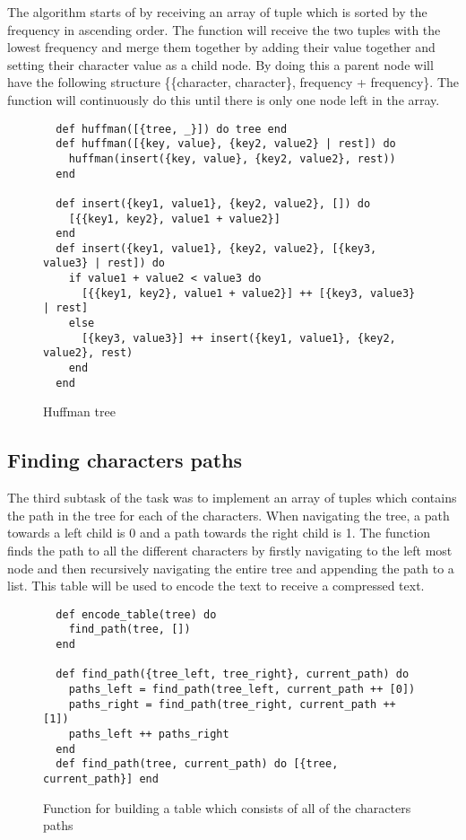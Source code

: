 \documentclass[a4paper,11pt]{article}
\begin{document}
The algorithm starts of by receiving an array of tuple which is sorted by the frequency in ascending order. The function will receive the two tuples with the lowest frequency and merge them together by adding their value together and setting their character value as a child node. By doing this a parent node will have the following structure \{\{character, character\}, frequency + frequency\}. The function will continuously do this until there is only one node left in the array.

\begin{figure}[H]
\begin{verbatim}
  def huffman([{tree, _}]) do tree end
  def huffman([{key, value}, {key2, value2} | rest]) do
    huffman(insert({key, value}, {key2, value2}, rest))
  end

  def insert({key1, value1}, {key2, value2}, []) do
    [{{key1, key2}, value1 + value2}]
  end
  def insert({key1, value1}, {key2, value2}, [{key3, value3} | rest]) do
    if value1 + value2 < value3 do
      [{{key1, key2}, value1 + value2}] ++ [{key3, value3} | rest]
    else
      [{key3, value3}] ++ insert({key1, value1}, {key2, value2}, rest)
    end
  end
\end{verbatim}
\caption{Huffman tree}
\label{Figure:2}
\end{figure}

\subsection*{Finding characters paths}
The third subtask of the task was to implement an array of tuples which contains the path in the tree for each of the characters. When navigating the tree, a path towards a left child is 0 and a path towards the right child is 1. The function finds the path to all the different characters by firstly navigating to the left most node and then recursively navigating the entire tree and appending the path to a list. This table will be used to encode the text to receive a compressed text.

\begin{figure}[H]
\begin{verbatim}
  def encode_table(tree) do
    find_path(tree, [])
  end

  def find_path({tree_left, tree_right}, current_path) do
    paths_left = find_path(tree_left, current_path ++ [0])
    paths_right = find_path(tree_right, current_path ++ [1])
    paths_left ++ paths_right
  end
  def find_path(tree, current_path) do [{tree, current_path}] end
\end{verbatim}
\caption{Function for building a table which consists of all of the characters paths}
\label{Figure:3}
\end{figure}
\end{document}
